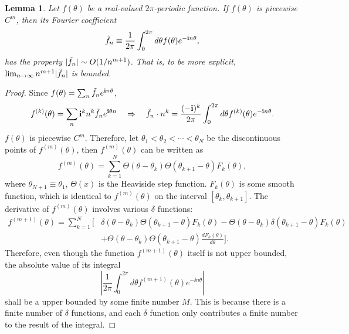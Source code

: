\documentclass[12pt, nofootinbib]{article}
\theoremstyle{plain}
\theoremstyle{assumption}
\theoremstyle{definition}
\theoremstyle{plain}
\theoremstyle{plain}
\newtheorem{lemma}[theorem]{Lemma}
\theoremstyle{plain}
\theoremstyle{plain}
\theoremstyle{plain}
\begin{document}
\begin{lemma}\label{lemma:fourier-discontinuity}
    Let $f(\theta)$ be a real-valued $2\pi$-periodic function. If $f(\theta)$ is piecewise $C^m$, then its Fourier coefficient 
    \begin{equation}
        \Tilde{f}_n \equiv {1 \over 2\pi}\int_0^{2\pi}d\theta f(\theta) e^{-{\bf i} n\theta},
    \end{equation}
    has the property $|\Tilde{f}_n|\sim O(1/n^{m+1})$. That is, to be more explicit, $\lim_{n\to\infty}n^{m+1}|\Tilde{f}_n|$ is bounded. 
\end{lemma}
\begin{proof}
    Since $f(\theta) = \sum_n \Tilde{f}_n e^{{\bf i} n\theta}$, 
    \begin{equation}\label{eq:intfm}
        f^{(k)}(\theta) = \sum_{n} {{\bf i}}^k n^{k} \Tilde{f}_n e^{{\bf i} \theta n}\quad \Rightarrow \quad \Tilde{f}_n \cdot n^{k} ={(-{\bf i})^k \over 2\pi } \int_0^{2\pi} d\theta f^{(k)}(\theta)e^{-{\bf i} n\theta}.
    \end{equation}
    $f(\theta)$ is piecewise $C^m$. Therefore, let $\theta_1<\theta_2<\cdots <\theta_N$ be the discontinuous points of $f^{(m)}(\theta)$, then $f^{(m)}(\theta)$ can be written as 
    \begin{equation}
        f^{(m)}(\theta) = \sum_{k=1}^{N} \Theta(\theta-\theta_{k})\Theta(\theta_{k+1}-\theta)F_k(\theta),
    \end{equation}
    where $\theta_{N+1}\equiv \theta_1$, $\Theta(x)$ is the Heaviside step function. $F_k(\theta)$ is some smooth function, which is identical to $f^{(m)}(\theta)$ on the interval $[\theta_{k},\theta_{k+1}]$. The derivative of $f^{(m)}(\theta)$ involves various $\delta$ functions: 
    \begin{equation}\begin{split}
        f^{(m+1)}(\theta) = \sum_{k=1}^N \Big[& \delta(\theta-\theta_k)\Theta(\theta_{k+1}-\theta)F_k(\theta) - \Theta(\theta-\theta_{k})\delta(\theta_{k+1}-\theta)F_k(\theta) \\ 
        &+ \Theta(\theta-\theta_{k})\Theta(\theta_{k+1}-\theta)\frac{dF_k(\theta)}{d\theta}\Big]. 
    \end{split}
    \end{equation}
    Therefore, even though the function $f^{(m+1)}(\theta)$ itself is not upper bounded, the absolute value of its integral  
    \begin{equation}
       \left|  \frac{1}{2\pi} \int_0^{2\pi}d\theta f^{(m+1)}(\theta) e^{-\ii n\theta}  \right|
    \end{equation}
    shall be a upper bounded by some finite number $M$. This is because there is a finite number of $\delta$ functions, and each $\delta$ function only contributes a finite number to the result of the integral. 


\end{proof}
\end{document}
